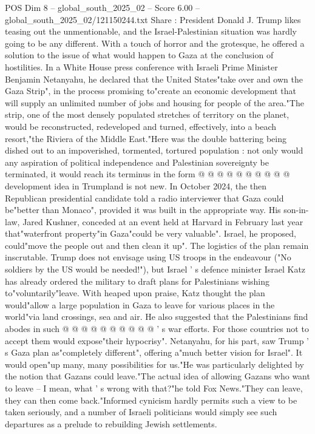 \begin{textsample}{POS Dim 8 – global\_south\_2025\_02 – Score 6.00 – global\_south\_2025\_02/121150244.txt}  \label{ex:f8_pos_080}
Share : President Donald J.
Trump likes teasing out the unmentionable, and the Israel-Palestinian situation was hardly going to be any different.
With a touch of horror and the grotesque, he offered a solution to the issue of what would happen to Gaza at the conclusion of hostilities.
In a White House press conference with Israeli Prime Minister Benjamin Netanyahu, he declared that the United States"take over and own the Gaza Strip", in the process promising to"create an economic development that will supply an unlimited number of jobs and housing for people of the area."The strip, one of the most densely populated stretches of territory on the planet, would be reconstructed, redeveloped and turned, effectively, into a beach resort,"the Riviera of the Middle East."Here was the double battering being dished out to an impoverished, tormented, tortured population : not only would any aspiration of political independence and Palestinian sovereignty be terminated, it would reach its terminus in the form @ @ @ @ @ @ @ @ @ @ development idea in Trumpland is not new.
In October 2024, the then Republican presidential candidate told a radio interviewer that Gaza could be"better than Monaco", provided it was built in the appropriate way.
His son-in-law, Jared Kushner, conceded at an event held at Harvard in February last year that"waterfront property"in Gaza"could be very valuable".
Israel, he proposed, could"move the people out and then clean it up".
The logistics of the plan remain inscrutable.
Trump does not envisage using US troops in the endeavour ("No soldiers by the US would be needed!"), but Israel ' s defence minister Israel Katz has already ordered the military to draft plans for Palestinians wishing to"voluntarily"leave.
With heaped upon praise, Katz thought the plan would"allow a large population in Gaza to leave for various places in the world"via land crossings, sea and air.
He also suggested that the Palestinians find abodes in such @ @ @ @ @ @ @ @ @ @ ' s war efforts.
For those countries not to accept them would expose"their hypocrisy".
Netanyahu, for his part, saw Trump ' s Gaza plan as"completely different", offering a"much better vision for Israel".
It would open"up many, many possibilities for us."He was particularly delighted by the notion that Gazans could leave."The actual idea of allowing Gazans who want to leave -- I mean, what ' s wrong with that?"he told Fox News."They can leave, they can then come back."Informed cynicism hardly permits such a view to be taken seriously, and a number of Israeli politicians would simply see such departures as a prelude to rebuilding Jewish settlements.

\end{textsample}
